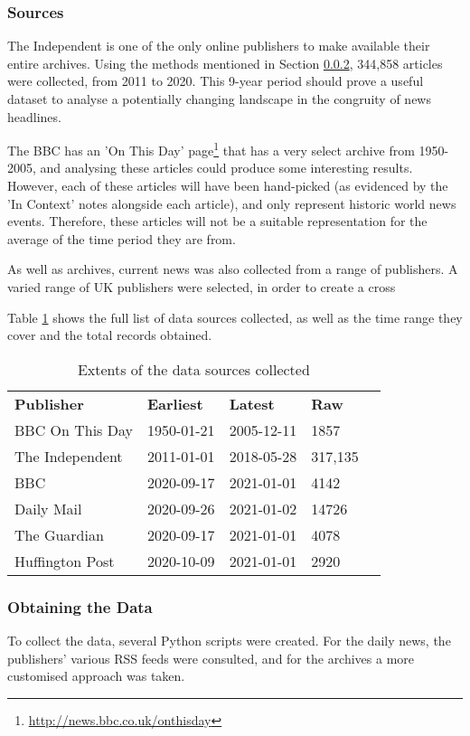 \subsubsection{Sources}
The Independent is one of the only online publishers to make available their entire archives. Using the methods mentioned in Section \ref{obtaining-data}, 344,858 articles were collected, from 2011 to 2020. This 9-year period should prove a useful dataset to analyse a potentially changing landscape in the congruity of news headlines.

The BBC has an 'On This Day' page\footnote{\url{http://news.bbc.co.uk/onthisday}} that has a very select archive from 1950-2005, and analysing these articles could produce some interesting results. However, each of these articles will have been hand-picked (as evidenced by the 'In Context' notes alongside each article), and only represent historic world news events. Therefore, these articles will not be a suitable representation for the average of the time period they are from.

As well as archives, current news was also collected from a range of publishers. A varied range of UK publishers were selected, in order to create a cross

Table \ref{tab:data-sources} shows the full list of data sources collected, as well as the time range they cover and the total records obtained.

\begin{table}[h]
\begin{tabular}{lllll}
\textbf{Publisher} & \textbf{Earliest} & \textbf{Latest} & \textbf{Raw} \\
BBC On This Day & 1950-01-21 & 2005-12-11 & 1857 \\
The Independent & 2011-01-01 & 2018-05-28 & 317,135  \\
BBC & 2020-09-17 & 2021-01-01 & 4142  \\
Daily Mail & 2020-09-26 & 2021-01-02 & 14726 \\
The Guardian & 2020-09-17 & 2021-01-01 & 4078 \\
Huffington Post & 2020-10-09 & 2021-01-01 & 2920 \\
\end{tabular}
\caption{Extents of the data sources collected}
\label{tab:data-sources}
\end{table}

\subsubsection{Obtaining the Data} \label{obtaining-data}
To collect the data, several Python scripts were created. For the daily news, the publishers' various RSS feeds were consulted, and for the archives a more customised approach was taken.

